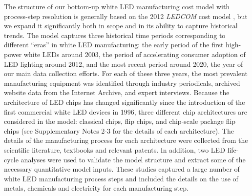 \documentclass[parskip=full]{article}
\begin{document}
The structure of our bottom-up white LED manufacturing cost model with process-step resolution is generally based on the 2012 \textit{LEDCOM} cost model \cite{ledcomv2}, but we expand it significantly both in scope and in its ability to capture historical trends. The model captures three historical time periods corresponding to different “eras” in white LED manufacturing: the early period of the first high-power white LEDs around 2003, the period of accelerating consumer adoption of LED lighting around 2012, and the most recent period around 2020, the year of our main data collection efforts. For each of these three years, the most prevalent manufacturing equipment was identified through industry periodicals, archived website data from the Internet Archive, and expert interviews. Because the architecture of LED chips has changed significantly since the introduction of the first commercial white LED devices in 1996, three different chip architectures are considered in the model: classical chips, flip chips, and chip-scale package flip chips (see Supplementary Notes 2-3 for the details of each architecture). The details of the manufacturing process for each architecture were collected from the scientific literature, textbooks and relevant patents. In addition, two LED life-cycle analyses were used to validate the model structure and extract some of the necessary quantitative model inputs. These studies captured a large number of white LED manufacturing process steps and included the details on the use of metals, chemicals and electricity for each manufacturing step.
\end{document}
